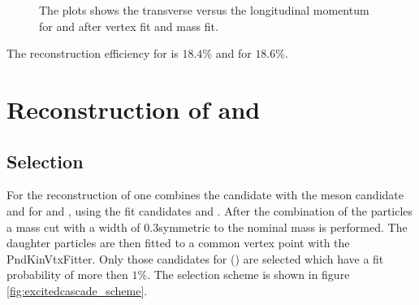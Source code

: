 		\begin{figure}
			\caption{\propose The plots shows the transverse versus the longitudinal momentum for \anticascade and \cascade after vertex fit and mass fit.}
			\label{fig:XiPlus_pt_vs_pz}
		
		\end{figure}
		
		The reconstruction efficiency for \anticascade is $18.4\%$ and for \cascade $18.6\%$.
		
	
	
	

\section{Reconstruction of \excitedcascade and \excitedanticascade}
		\subsection*{Selection}

		For the reconstruction of \excitedcascade one combines the \lam candidate with the \kminus meson candidate and for \excitedanticascade \alam and \kplus, using the
		fit candidates \lam and \alam.
		After the combination of the particles a mass cut with a width of $0.3$\massunit symmetric to the nominal \excitedcascade mass is performed. 
		The daughter particles are  then fitted to a common vertex point with the PndKinVtxFitter.
		Only those candidates for \excitedcascade (\excitedanticascade) are selected which have a fit probability of more then $1\%$.
		The selection scheme is shown in figure \ref{fig:excitedcascade_scheme}. 
		
